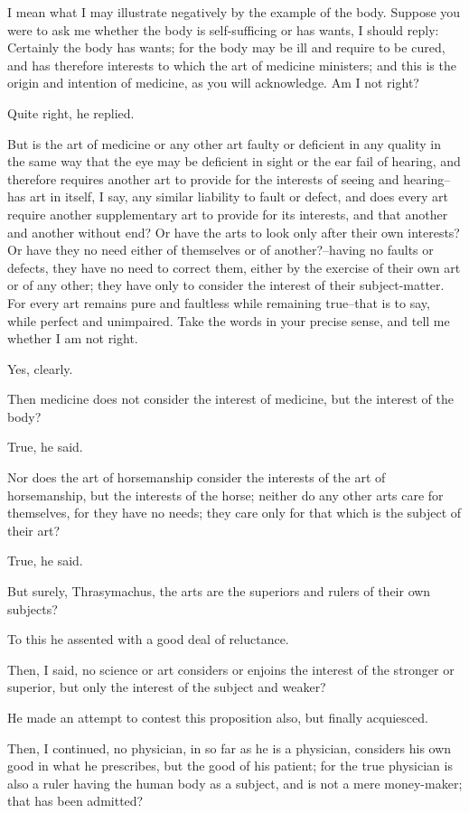 I mean what I may illustrate negatively by the example of the body.
Suppose you were to ask me whether the body is self-sufficing or has
wants, I should reply: Certainly the body has wants; for the body may
be ill and require to be cured, and has therefore interests to which
the art of medicine ministers; and this is the origin and intention of
medicine, as you will acknowledge. Am I not right?

Quite right, he replied.

But is the art of medicine or any other art faulty or deficient in any
quality in the same way that the eye may be deficient in sight or the
ear fail of hearing, and therefore requires another art to provide
for the interests of seeing and hearing--has art in itself, I say, any
similar liability to fault or defect, and does every art require another
supplementary art to provide for its interests, and that another and
another without end? Or have the arts to look only after their
own interests? Or have they no need either of themselves or of
another?--having no faults or defects, they have no need to correct
them, either by the exercise of their own art or of any other; they have
only to consider the interest of their subject-matter. For every art
remains pure and faultless while remaining true--that is to say, while
perfect and unimpaired. Take the words in your precise sense, and tell
me whether I am not right.

Yes, clearly.

Then medicine does not consider the interest of medicine, but the
interest of the body?

True, he said.

Nor does the art of horsemanship consider the interests of the art of
horsemanship, but the interests of the horse; neither do any other arts
care for themselves, for they have no needs; they care only for that
which is the subject of their art?

True, he said.

But surely, Thrasymachus, the arts are the superiors and rulers of their
own subjects?

To this he assented with a good deal of reluctance.

Then, I said, no science or art considers or enjoins the interest of the
stronger or superior, but only the interest of the subject and weaker?

He made an attempt to contest this proposition also, but finally
acquiesced.

Then, I continued, no physician, in so far as he is a physician,
considers his own good in what he prescribes, but the good of his
patient; for the true physician is also a ruler having the human body as
a subject, and is not a mere money-maker; that has been admitted?

